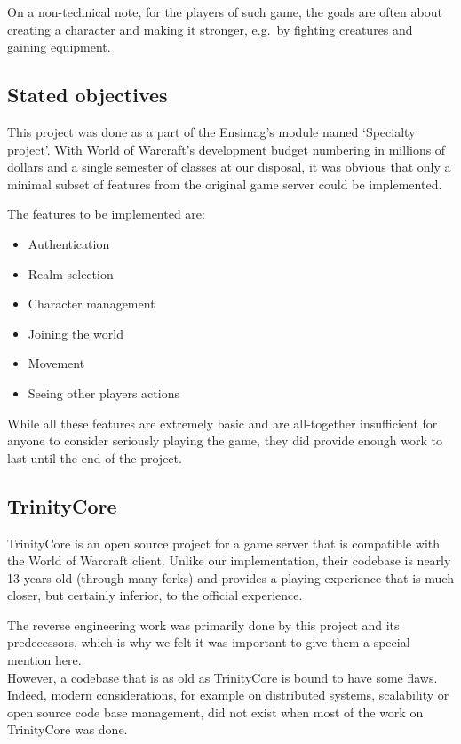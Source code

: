 \documentclass[paper=a4, fontsize=11pt]{scrartcl}
\begin{document}
On a non-technical note, for the players of such game, the goals are often about
creating a character and making it stronger, e.g.\ by fighting creatures and
gaining equipment.

\subsection{Stated objectives}

This project was done as a part of the Ensimag's module named `Specialty
project'.
With World of Warcraft's development budget numbering in millions of dollars and
a single semester of classes at our disposal, it was obvious that only a minimal
subset of features from the original game server could be implemented.\

The features to be implemented are:
\begin{itemize}
    \item Authentication
    \item Realm selection
    \item Character management
    \item Joining the world
    \item Movement
    \item Seeing other players actions
\end{itemize}

While all these features are extremely basic and are all-together insufficient
for anyone to consider seriously playing the game, they did provide enough work
to last until the end of the project.

\subsection{TrinityCore}

TrinityCore is an open source project for a game server that is compatible with
the World of Warcraft client.
Unlike our implementation, their codebase is nearly 13 years old (through many
forks) and provides a playing experience that is much closer, but certainly
inferior, to the official experience.

The reverse engineering work was primarily done by this project and its
predecessors, which is why we felt it was important to give them a special
mention here.\\

However, a codebase that is as old as TrinityCore is bound to have some
flaws. Indeed, modern considerations, for example on distributed systems,
scalability or open source code base management, did not exist when most of the
work on TrinityCore was done.
\end{document}
